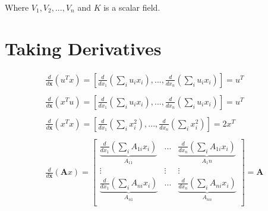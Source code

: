 Where $V_1, V_2, ... , V_n$ and $K$ is a scalar field.


\section{Taking Derivatives}

\begin{equation}
\begin{array}{l}
\frac{d}{d\mathbf{x}} \left(u^Tx\right) = \left[\frac{d}{dx_1}\left(\sum_i u_i x_i\right),...,\frac{d}{dx_n}\left(\sum_i u_i x_i\right)\right] = u^T\\
\\
\frac{d}{d\mathbf{x}} \left(x^Tu\right) = \left[\frac{d}{dx_1}\left(\sum_i u_i x_i\right),...,\frac{d}{dx_n}\left(\sum_i u_i x_i\right)\right] = u^T\\
\\
\frac{d}{d\mathbf{x}} \left(x^Tx\right) = \left[\frac{d}{dx_1}\left(\sum_i x_i^2\right),...,\frac{d}{dx_n}\left(\sum_i x_i^2\right)\right] = 2x^T\\
\\
\frac{d}{d\mathbf{x}} \left(\mathbf{A}x\right) = \left[
\begin{array}{ccc} 
\underbrace{\frac{d}{dx_1}\left(\sum_i A_{1i} x_i\right)}_{A_{11}} &...& \underbrace{\frac{d}{dx_n}\left(\sum_i A_{1i} x_i\right)}_{A_1n}\\
\vdots&\vdots&\vdots\\
\underbrace{\frac{d}{dx_1}\left(\sum_i A_{ni} x_i\right)}_{A_{n1}} &...& \underbrace{\frac{d}{dx_n}\left(\sum_i A_{ni} x_i\right)}_{A_{nn}}\\
\end{array}\right] = \mathbf{A}\\
\end{array}
\end{equation}


\chapauthor{}
